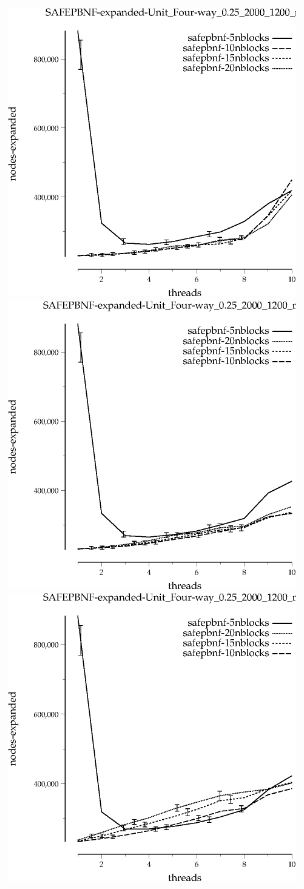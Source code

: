 \documentclass{article}
\begin{document}
\begin{figure}[t]
\begin{center}
\includegraphics[width=3in]{grid_unit_four-way_0.25_2000_1200/SAFEPBNF-expanded-Unit_Four-way_0.25_2000_1200_min=5.eps}
\includegraphics[width=3in]{grid_unit_four-way_0.25_2000_1200/SAFEPBNF-expanded-Unit_Four-way_0.25_2000_1200_min=10.eps}
\includegraphics[width=3in]{grid_unit_four-way_0.25_2000_1200/SAFEPBNF-expanded-Unit_Four-way_0.25_2000_1200_min=30.eps}

\end{center}
\end{figure}
\end{document}
